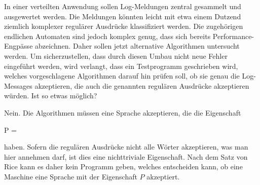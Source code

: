 In einer verteilten Anwendung sollen Log-Meldungen zentral gesammelt
und ausgewertet werden.
Die Meldungen könnten leicht mit etwa einem Dutzend ziemlich
komplexer regulärer Ausdrücke klassifiziert werden.
Die zugehörigen endlichen Automaten sind jedoch komplex genug, dass
sich bereits Performance-Engpässe abzeichnen.
Daher sollen jetzt alternative Algorithmen untersucht werden.
Um sicherzustellen, dass durch diesen Umbau nicht neue Fehler
eingeführt werden, wird verlangt, dass ein Testprogramm geschrieben
wird, welches vorgeschlagene Algorithmen darauf hin prüfen soll,
ob sie genau die Log-Messages akzeptieren, die auch die genannten
regulären Ausdrücke akzeptieren würden.
Ist so etwas möglich?

\begin{loesung}
Nein.
Die Algorithmen müssen eine Sprache akzeptieren, die die Eigenschaft
\begin{center}
P = 
\end{center}
haben.
Sofern die regulären Ausdrücke nicht alle Wörter akzeptieren, was man
hier annehmen darf, ist dies eine nichttriviale Eigenschaft.
Nach dem Satz von Rice kann es daher kein Programm geben, welches
entscheiden kann, ob eine Maschine eine Sprache mit der Eigenschaft
$P$ akzeptiert.
\end{loesung}






